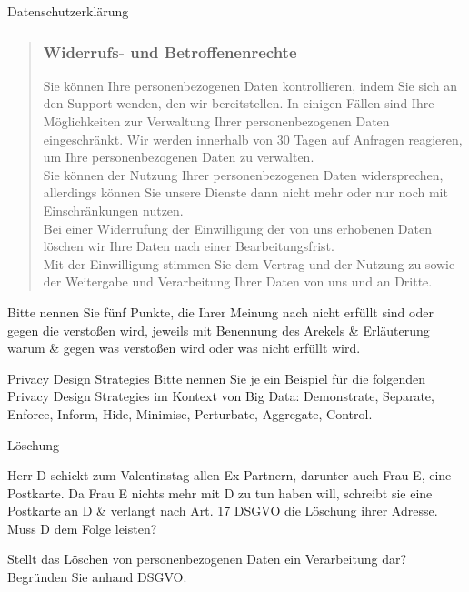 \documentclass{exercisesheet}
\begin{document}
\begin{exercise}{Datenschutzerklärung}
\begin{quote}
    \subsubsection*{Widerrufs- und Betroffenenrechte}
    Sie können Ihre personenbezogenen Daten kontrollieren, indem Sie sich an den Support wenden, den wir bereitstellen. In einigen Fällen sind Ihre Möglichkeiten zur Verwaltung Ihrer personenbezogenen Daten eingeschränkt. Wir werden innerhalb von 30 Tagen auf Anfragen reagieren, um Ihre personenbezogenen Daten zu verwalten.\\
    Sie können der Nutzung Ihrer personenbezogenen Daten widersprechen, allerdings können Sie unsere Dienste dann nicht mehr oder nur noch mit Einschränkungen nutzen.\\
    Bei einer Widerrufung der Einwilligung der von uns erhobenen Daten löschen wir Ihre Daten nach einer Bearbeitungsfrist.
    \vspace{1em}\\
    Mit der Einwilligung stimmen Sie dem Vertrag und der Nutzung zu sowie der Weitergabe und Verarbeitung Ihrer Daten von uns und an Dritte.
  \end{quote}

  Bitte nennen Sie fünf Punkte, die Ihrer Meinung nach nicht erfüllt sind oder gegen die verstoßen wird, jeweils mit Benennung des Arekels \& Erläuterung warum \& gegen was verstoßen wird oder was nicht erfüllt wird.
\end{exercise}

\begin{exercise}{Privacy Design Strategies}
  Bitte nennen Sie je ein Beispiel für die folgenden Privacy Design Strategies im Kontext von Big Data: Demonstrate, Separate, Enforce, Inform, Hide, Minimise, Perturbate, Aggregate, Control.
\end{exercise}

\begin{exercise**}{Löschung}
  \item Herr D schickt zum Valentinstag allen Ex-Partnern, darunter auch Frau E, eine Postkarte. Da Frau E nichts mehr mit D zu tun haben will, schreibt sie eine Postkarte an D \& verlangt nach Art. 17 DSGVO die Löschung ihrer Adresse. Muss D dem Folge leisten?
  \item Stellt das Löschen von personenbezogenen Daten ein Verarbeitung dar? Begründen Sie anhand DSGVO.
\end{exercise**}
\end{document}
